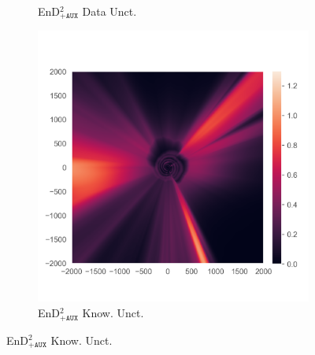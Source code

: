 \begin{figure}
\begin{subfigure}{0.22\textwidth}
  \caption{EnD$^2_{\texttt{+AUX}}$ Data Unct.}
  \label{fig:3h}
\end{subfigure}%
\begin{subfigure}{0.22\textwidth}
  \centering
  \includegraphics[trim=42 45 15 55, clip, width=\linewidth]{plots/3i.png}
  \caption{EnD$^2_{\texttt{+AUX}}$ Know. Unct.}
  \label{fig:3i}
\end{subfigure}%


\end{figure}
